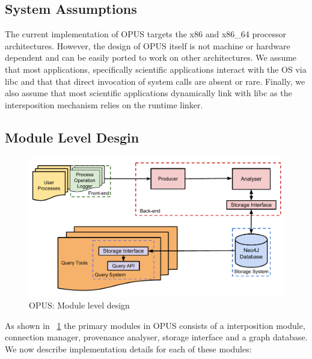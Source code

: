 \documentclass[withindex,glossary]{cam-thesis}
\begin{document}
\subsection{System Assumptions}
The current implementation of OPUS targets the x86 and x86\_64 processor architectures.
However, the design of OPUS itself is not machine or hardware dependent and can be easily ported to work on other architectures.
We assume that most applications, specifically scientific applications interact with the OS via libc and that that direct invocation of system calls are absent or rare.
Finally, we also assume that most scientific applications dynamically link with libc as the intersposition mechanism relies on the runtime linker.

\subsection{Module Level Desgin}

\begin{figure}[t!]
  \centering
    \includegraphics[width=1.0\columnwidth]{ProvDesign}
  \caption{OPUS: Module level design}
  \label{fig:opuslld}
\end{figure}

As shown in ~\ref{fig:opuslld} the primary modules in OPUS consists of a interposition module, connection manager, provenance analyser, storage interface and a graph database.
We now describe implementation details for each of these modules:
\end{document}
